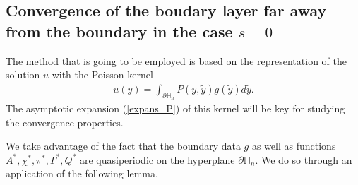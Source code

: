 \documentclass[11pt, reqno]{amsart}
\theoremstyle{definition}
\theoremstyle{remark}
\numberwithin{equation}{section}
\begin{document}
		\subsection{Convergence of the boudary layer far away from the boundary in the case $s=0$}	\noindent The method that is going to be employed is based on the representation of the solution $u$ with the Poisson kernel
	\begin{align}
		u(y)=\int_{\partial\mathbb{H}_n} P(y,\tilde{y}) g(\tilde{y}) d\tilde{y}\label{represent_u}.
	\end{align}
	The asymptotic expansion (\ref{expans_P}) of this kernel will be key for studying the convergence properties. 
	
	\noindent We take advantage of the fact that the boundary data $g$    as well as functions $A^*,\chi^* ,\pi^* , \Gamma^*, Q^* $ are quasiperiodic on the hyperplane  $\partial\mathbb{H}_n$. We do so through an application of the following lemma.
	
\end{document}
